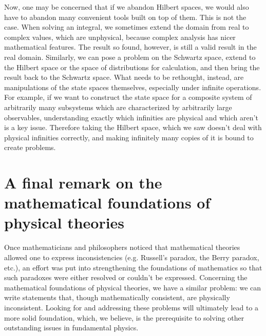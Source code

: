 \documentclass[10pt,twocolumn, nofootinbib]{revtex4-2}
\begin{document}
Now, one may be concerned that if we abandon Hilbert spaces, we would also have to abandon many convenient tools built on top of them. This is not the case. When solving an integral, we sometimes extend the domain from real to complex values, which are unphysical, because complex analysis has nicer mathematical features. The result so found, however, is still a valid result in the real domain. Similarly, we can pose a problem on the Schwartz space, extend to the Hilbert space or the space of distributions for calculation, and then bring the result back to the Schwartz space. What needs to be rethought, instead, are manipulations of the state spaces themselves, especially under infinite operations. For example, if we want to construct the state space for a composite system of arbitrarily many subsystems which are characterized by arbitrarily large observables, understanding exactly which infinities are physical and which aren't is a key issue. Therefore taking the Hilbert space, which we saw doesn't deal with physical infinities correctly, and making infinitely many copies of it is bound to create problems.


\section{A final remark on the mathematical foundations of physical theories}

Once mathematicians and philosophers noticed that mathematical theories allowed one to express inconsistencies (e.g. Russell's paradox, the Berry paradox, etc.), an effort was put into strengthening the foundations of mathematics so that such paradoxes were either resolved or couldn't be expressed. Concerning the mathematical foundations of physical theories, we have a similar problem: we can write statements that, though mathematically consistent, are physically inconsistent. Looking for and addressing these problems will ultimately lead to a more solid foundation, which, we believe, is the prerequisite to solving other outstanding issues in fundamental physics.
\end{document}
